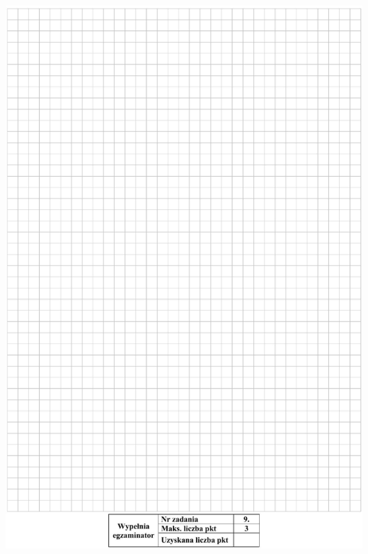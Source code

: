 \documentclass[10pt]{article}
\begin{document}
\includegraphics[max width=\textwidth, center]{2024_11_21_054c332d5c02f869c372g-09}
\end{document}
